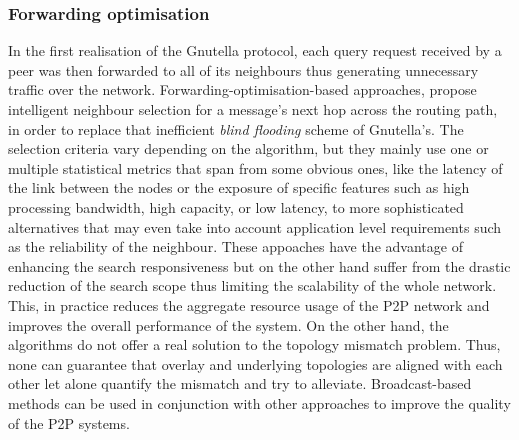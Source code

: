 \subsubsection{Forwarding optimisation}
In the first realisation of the Gnutella protocol, each query request received
by a peer was then forwarded to all of its neighbours thus generating
unnecessary traffic over the network. Forwarding-optimisation-based approaches,
propose intelligent neighbour selection for a message's next hop across the
routing path, in order to replace that inefficient \emph{blind flooding} scheme
of Gnutella's. The selection criteria vary depending on the algorithm, but they
mainly use one or multiple statistical metrics that span from some obvious ones,
like the latency of the link between the nodes or the exposure of specific
features such as high processing bandwidth, high capacity, or low latency, to
more sophisticated alternatives that may even take into account application
level requirements such as the reliability of the neighbour.
These appoaches have the advantage of enhancing the search responsiveness but on
the other hand suffer from the drastic reduction of the search scope thus
limiting the scalability of the whole network. This, in practice reduces the
aggregate resource usage of the P2P network and improves the overall performance
of the system. On the other hand, the algorithms do not offer a real solution to
the topology mismatch problem. Thus, none can guarantee that overlay and
underlying topologies are aligned with each other let alone quantify the
mismatch and try to alleviate. Broadcast-based methods can be used in
conjunction with other approaches to improve the quality of the P2P systems.



